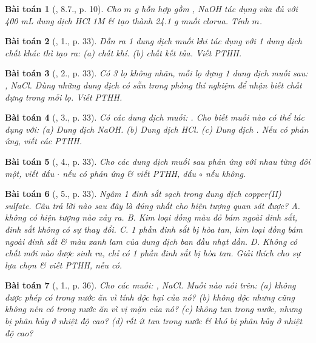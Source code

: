 \documentclass{article}
\newtheorem{baitoan}{Bài toán}
\begin{document}
\begin{baitoan}[\cite{SGK_Hoa_Hoc_9}, 8.7., p. 10]
	Cho $m$ {\rm g} hỗn hợp gồm {\rm{}, NaOH} tác dụng vừa đủ với {\rm400 mL} dung dịch {\rm HCl 1M} \& tạo thành {\rm24.1 g} muối clorua. Tính $m$.
\end{baitoan}

\begin{baitoan}[\cite{SGK_Hoa_Hoc_9}, 1., p. 33]
	Dẫn ra 1 dung dịch muối khi tác dụng với 1 dung dịch chất khác thì tạo ra: (a) chất khí. (b) chất kết tủa. Viết {\rm PTHH}.
\end{baitoan}

\begin{baitoan}[\cite{SGK_Hoa_Hoc_9}, 2., p. 33]
	Có 3 lọ không nhãn, mỗi lọ đựng 1 dung dịch muối sau: {\rm{}, NaCl}. Dùng những dung dịch có sẵn trong phòng thí nghiệm để nhận biết chất đựng trong mỗi lọ. Viết {\rm PTHH}.
\end{baitoan}

\begin{baitoan}[\cite{SGK_Hoa_Hoc_9}, 3., p. 33]
	Có các dung dịch muối: {\rm{}}. Cho biết muối nào có thể tác dụng với: (a) Dung dịch {\rm NaOH}. (b) Dung dịch {\rm HCl}. (c) Dung dịch {\rm{}}. Nếu có phản ứng, viết các PTHH.
\end{baitoan}

\begin{baitoan}[\cite{SGK_Hoa_Hoc_9}, 4., p. 33]
	Cho các dung dịch muối sau phản ứng với nhau từng đôi một, viết dấu $\cdot$ nếu có phản ứng \& viết PTHH, dấu $\circ$ nếu không.
\end{baitoan}

\begin{baitoan}[\cite{SGK_Hoa_Hoc_9}, 5., p. 33]
	Ngâm 1 đinh sắt sạch trong dung dịch copper(II) sulfate. Câu trả lời nào sau đây là đúng nhất cho hiện tượng quan sát được? {\sf A.} không có hiện tượng nào xảy ra. {\sf B.} Kim loại đồng màu đỏ bám ngoài đinh sắt, đinh sắt không có sự thay đổi. {\sf C.} 1 phần đinh sắt bị hòa tan, kim loại đồng bám ngoài đinh sắt \& màu xanh lam của dung dịch ban đầu nhạt dần. {\sf D.} Không có chất mới nào được sinh ra, chỉ có 1 phần đinh sắt bị hòa tan. Giải thích cho sự lựa chọn \& viết PTHH, nếu có.
\end{baitoan}

\begin{baitoan}[\cite{SGK_Hoa_Hoc_9}, 1., p. 36]
	Cho các muối: {\rm{}, NaCl}. Muối nào nói trên: (a) không được phép có trong nước ăn vì tính độc hại của nó? (b) không độc nhưng cũng không nên có trong nước ăn vì vị mặn của nó? (c) không tan trong nước, nhưng bị phân hủy ở nhiệt độ cao? (d) rất ít tan trong nước \& khó bị phân hủy ở nhiệt độ cao?
\end{baitoan}
\end{document}
